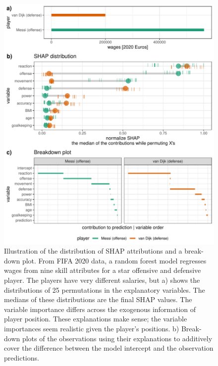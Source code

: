 \documentclass[
  article]{article}
\begin{document}
\begin{figure}

{\centering \includegraphics[width=29.17in]{./figures/shap_distr_bd} 

}

\caption{Illustration of the distribution of SHAP attributions and a break-down plot. From FIFA 2020 data, a random forest model regresses wages from nine skill attributes for a star offensive and defensive player. The players have very different salaries, but a) shows the distributions of 25 permutations in the explanatory variables. The medians of these distributions are the final SHAP values. The variable importance differs across the exogenous information of player position. These explanations make sense; the variable importances seem realistic given the player's positions. b) Break-down plots of the observations using their explanations to additively cover the difference between the model intercept and the observation predictions.}\label{fig:shapdistrbd}
\end{figure}
\end{document}
